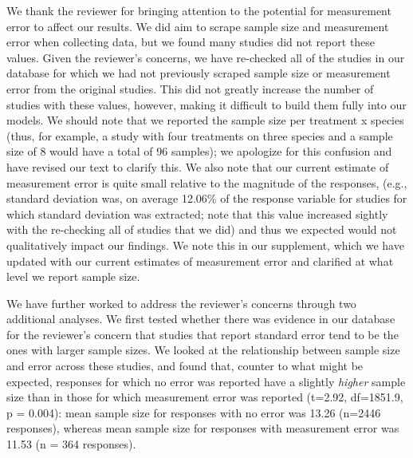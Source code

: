 \documentclass{article}
\begin{document}
We thank the reviewer for bringing attention to the potential for measurement error to affect our results. We did aim to scrape sample size and measurement error when collecting data, but we found many studies did not report these values. Given the reviewer's concerns, we have re-checked all of the studies in our database for which we had not previously scraped sample size or measurement error from the original studies. This did not greatly increase the number of studies with these values, however, making it difficult to build them fully into our models. We should note that we reported the sample size per treatment x species (thus, for example, a study with four treatments on three species and a sample size of 8 would have a total of 96 samples); we apologize for this confusion and have revised our text to clarify this. We also note that our current estimate of measurement error is quite small relative to the magnitude of the responses, (e.g., standard deviation was, on average 12.06\% of the response variable for studies for which standard deviation was extracted; note that this value increased sightly with the re-checking all of studies that we did) and thus we expected would not qualitatively impact our findings. We note this in our supplement, which we have updated with our current estimates of measurement error and clarified at what level we report sample size. 

We have further worked to address the reviewer's concerns through two additional analyses. We first tested whether there was evidence in our database for the reviewer's concern that studies that report standard error tend to be the ones with larger sample sizes. We looked at the relationship between sample size and error across these studies, and found that, counter to what might be expected, responses for which no error was reported have a slightly \emph{higher} sample size than in those for which measurement error was reported (t=2.92, df=1851.9, p = 0.004): mean sample size for responses with no error was 13.26 (n=2446 responses), whereas mean sample size for responses with measurement error was 11.53 (n = 364 responses).
\end{document}
